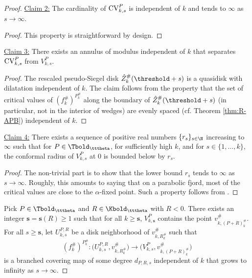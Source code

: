 \documentclass{amsart}
\begin{document}
\begin{proof}
    \vspace{0.1in}
    
    \noindent\underline{Claim 2:} The cardinality of $\textnormal{CV}^P_{k,s}$ is independent of $k$ and tends to $\infty$ as $s \to \infty$.

    \begin{proof}
        This property is straightforward by design.
    \end{proof}

    \vspace{0.1in}

    \noindent\underline{Claim 3:} There exists an annulus of modulus independent of $k$ that separates $\textnormal{CV}^P_{k,s}$ from $V^P_{k,s}$.

    \begin{proof}
        The rescaled pseudo-Siegel disk $\hat{Z}_k^{\#}(\threshold + s)$ is a quasidisk with dilatation independent of $k$.
        The claim follows from the property that the set of critical values of $(f_k^{\#})^{P_k^{\#}}$ along the boundary of $\hat{Z}_k^{\#}(\threshold + s)$ (in particular, not in the interior of wedges) are evenly spaced (cf. Theorem \ref{thm:R-APB}) independent of $k$.
    \end{proof}

    \vspace{0.1in}

    \noindent\underline{Claim 4:} There exists a sequence of positive real numbers $\{r_s\}_{s \in \N}$ increasing to $\infty$ such that for $P \in \Tbold_{\tttheta}$, for sufficiently high $k$, and for $s \in \{1,\ldots,k\}$, the conformal radius of $V^P_{k,s}$ at $0$ is bounded below by $r_s$.

    \begin{proof}
        The non-trivial part is to show that the lower bound $r_s$ tends to $\infty$ as $s \to \infty$. 
        Roughly, this amounts to saying that on a parabolic fjord, most of the critical values are close to the $\alpha$-fixed point.
        Such a property follows from \cite{DLy26a}.
    \end{proof}

    Pick $P \in \Tbold_{\tttheta}$ and $R \in \Kbold_{\tttheta}$ with $R<0$.
    There exists an integer $\mathbf{s}=\mathbf{s}(R) \geq 1$ such that for all $k \geq \mathbf{s}$, $V^P_{k,\mathbf{s}}$ contains the point $v^{\#}_{k,(P+R)_k^{\#}}$.
    For all $s \geq \mathbf{s}$, let $U^{P,R}_{k,s}$ be a disk neighborhood of $v^{\#}_{k,R_k^{\#}}$ such that 
        \begin{equation}
        \label{eqn:finite-branched-cov-map}
            (f_k^{\#})^{P_k^{\#}} : 
            \Big( U^{P,R}_{k,s}, v^{\#}_{k,R_k^{\#}} \Big)
            \to 
            \Big( V^P_{k,s}, v^{\#}_{k, (P+R)_k^{\#}} \Big)
        \end{equation}
    is a branched covering map of some degree $d_{P,R,s}$ independent of $k$ that grows to infinity as $s \to \infty$.
    \vspace{0.1in}


\end{proof}
\end{document}
